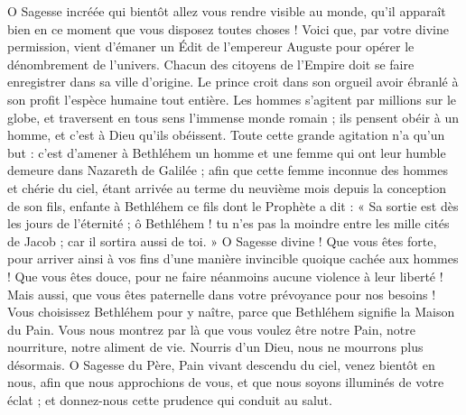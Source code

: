\documentclass[%
fontsize=10%
,a6paper%
,DIV=13%
]{scrartcl}
\begin{document}
O Sagesse incréée qui bientôt allez vous rendre visible au monde, qu’il apparaît bien en ce moment que vous disposez toutes choses ! Voici que, par votre divine permission, vient d’émaner un Édit de l’empereur Auguste pour opérer le dénombrement de l’univers. Chacun des citoyens de l’Empire doit se faire enregistrer dans sa ville d’origine. Le prince croit dans son orgueil avoir ébranlé à son profit l’espèce humaine tout entière. Les hommes s’agitent par millions sur le globe, et traversent en tous sens l’immense monde romain ; ils pensent obéir à un homme, et c’est à Dieu qu’ils obéissent. Toute cette grande agitation n’a qu’un but : c’est d’amener à Bethléhem un homme et une femme qui ont leur humble demeure dans Nazareth de Galilée ; afin que cette femme inconnue des hommes et chérie du ciel, étant arrivée au terme du neuvième mois depuis la conception de son fils, enfante à Bethléhem ce fils dont le Prophète a dit : « Sa sortie est dès les jours de l’éternité ; ô Bethléhem ! tu n’es pas la moindre entre les mille cités de Jacob ; car il sortira aussi de toi. » O Sagesse divine ! Que vous êtes forte, pour arriver ainsi à vos fins d’une manière invincible quoique cachée aux hommes ! Que vous êtes douce, pour ne faire néanmoins aucune violence à leur liberté ! Mais aussi, que vous êtes paternelle dans votre prévoyance pour nos besoins ! Vous choisissez Bethléhem pour y naître, parce que Bethléhem signifie la Maison du Pain. Vous nous montrez par là que vous voulez être notre Pain, notre nourriture, notre aliment de vie. Nourris d’un Dieu, nous ne mourrons plus désormais. O Sagesse du Père, Pain vivant descendu du ciel, venez bientôt en nous, afin que nous approchions de vous, et que nous soyons illuminés de votre éclat ; et donnez-nous cette prudence qui conduit au salut.

\end{document}
